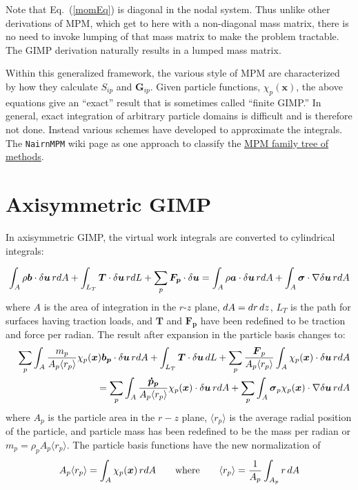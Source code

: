 \documentclass[11pt]{article}
\renewcommand{\vec}[1]{\boldsymbol{#1}}
\newcommand{\tens}[1]{\boldsymbol{\mathsf{#1}}}
\begin{document}
Note that Eq.~(\ref{momEq}) is diagonal in the nodal system. Thus unlike other derivations of MPM, which get to here with a non-diagonal mass matrix, there is no need to invoke lumping of that mass matrix to make the problem tractable. The GIMP derivation naturally results in a lumped mass matrix.

Within this generalized framework, the various style of MPM are characterized by how they calculate $S_{ip}$ and $\vec G_{ip}$. Given particle functions, $\chi_p(\vec x)$, the above equations give an ``exact'' result that is sometimes called ``finite GIMP.'' In general, exact integration of arbitrary particle domains is difficult and is therefore not done. Instead various schemes have developed to approximate the integrals. The {\tt NairnMPM} wiki page as one approach to classify the \href{http://osupdocs.forestry.oregonstate.edu/index.php/MPM_Methods_and_Simulation_Timing}{MPM family tree of methods}.

\section{Axisymmetric GIMP}

\def\avgrp{\langle r_p\rangle}

In axisymmetric GIMP, the virtual work integrals are converted to cylindrical integrals:

\begin{equation}
\int_A \rho \vec b\cdot \delta\vec u \thinspace r dA + \int_{L_T} \vec T \cdot \delta\vec u \thinspace r dL + \sum_p \vec {F_p} \cdot \delta\vec u
    = \int_A  \rho \vec a\cdot \delta\vec u\thinspace r dA + \int_A  \tens\sigma \cdot \nabla \delta\vec u\thinspace r dA
\end{equation}
where $A$ is the area of integration in the $r$-$z$ plane, $dA=dr\thinspace dz$,  $L_T$ is the path for surfaces having traction loads, and  $\vec T$ and $\vec{F_p}$ have been redefined to be traction and force per radian. The result after expansion in the particle basis changes to:
\begin{eqnarray}
&&\sum_p \int_A {m_p\over A_p\avgrp} \chi_p(\vec x)\vec{b_p}\cdot \delta\vec u \thinspace r dA + \int_{L_T}\vec T \cdot \delta\vec u \thinspace dL + 
                 \sum_p  {\vec F_p\over A_p\avgrp}\int_A \chi_p(\vec x) \cdot  \delta\vec u \thinspace r dA \\
    &&\qquad\qquad
    = \sum_p\int_A {\vec{\dot p_p}\over A_p\avgrp} \chi_p(\vec x)\cdot \delta\vec u\thinspace r dA +  \sum_p\int_A \tens\sigma_p \chi_p(\vec x) \cdot \nabla \delta\vec u\thinspace r dA
\end{eqnarray}
where $A_p$ is the particle area in the $r-z$ plane, $\avgrp$ is the average radial position of the particle, and particle mass has been redefined to be the mass per radian or $m_p = \rho_pA_p\avgrp$. The particle basis functions have the new normalization of
\begin{equation}
   A_p\avgrp =  \int_A \chi_p(\vec x)\thinspace r dA  \qquad {\rm where} \qquad \avgrp = {1\over A_p} \int_{A_p}  r \thinspace dA
\end{equation}
\end{document}
